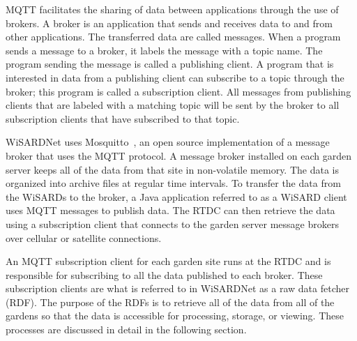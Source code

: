 MQTT facilitates the sharing of data between applications through the use of brokers. A broker is an application that sends and receives data to and from other applications. The transferred data are called messages. When a program sends a message to a broker, it labels the message with a topic name. The program sending the message is called a publishing client. A program that is interested in data from a publishing client can subscribe to a topic through the broker; this program is called a subscription client. All messages from publishing clients that are labeled with a matching topic will be sent by the broker to all subscription clients that have subscribed to that topic.

WiSARDNet uses Mosquitto~\cite{mosquitto}, an open source implementation of a message broker that uses the MQTT protocol. A message broker installed on each garden server keeps all of the data from that site in non-volatile memory. The data is organized into archive files at regular time intervals. To transfer the data from the WiSARDs to the broker, a Java application referred to as a WiSARD client uses MQTT messages to publish data. The RTDC can then retrieve the data using a subscription client that connects to the garden server message brokers over cellular or satellite connections.

An MQTT subscription client for each garden site runs at the RTDC and is responsible for subscribing to all the data published to each broker. These subscription clients are what is referred to in WiSARDNet as a raw data fetcher (RDF).  The purpose of the RDFs is to retrieve all of the data from all of the gardens so that the data is accessible for processing, storage, or viewing. These processes are discussed in detail in the following section.



